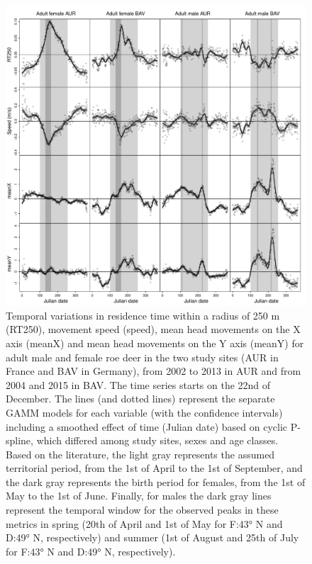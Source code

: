 \documentclass[a4paper,11pt]{article}
\begin{document}
\newpage
\begin{figure} [ht!]
  \centering
  \includegraphics[width=0.9\linewidth]{./figures/Fig2NB.pdf}
  \caption{Temporal variations in residence time within a radius of
    250 m (RT250), movement speed (speed), mean head movements on the
    X axis (meanX) and mean head movements on the Y axis (meanY) for
    adult male and female roe deer in the two study sites (AUR in
    France and BAV in Germany), from 2002 to 2013 in AUR and from 2004
    and 2015 in BAV. The time series starts on the 22nd of
    December. The lines (and dotted lines) represent the separate GAMM
    models for each variable (with the confidence intervals) including
    a smoothed effect of time (Julian date) based on cyclic P-spline,
    which differed among study sites, sexes and age classes. Based on
    the literature, the light gray represents the assumed territorial
    period, from the 1st of April to the 1st of September, and the
    dark gray represents the birth period for females, from the 1st of
    May to the 1st of June. Finally, for males the dark gray lines
    represent the temporal window for the observed peaks in these
    metrics in spring (20th of April and 1st of May for F:43° N and
    D:49° N, respectively) and summer (1st of August and 25th of July
    for F:43° N and D:49° N, respectively).}
\end{figure}
\end{document}
